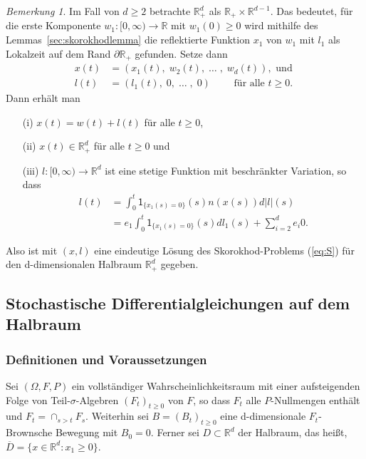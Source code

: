 \documentclass[10pt, a4paper, leqno, twoside, bibliography=totocnumbered, final]{scrartcl}
\theoremstyle{definition}
\theoremstyle{plain}%
\theoremstyle{remark}
\newtheorem*{bem}{Bemerkung}
\begin{document}
\begin{bem}
Im Fall von $d\geq 2$ betrachte $ \mathbb{R}^d_+ $ als $ \mathbb{R}_+ \times \mathbb{R}^{d-1} $. Das bedeutet, für die erste Komponente $w_1 : [0, \infty) \to \mathbb{R}$ mit $ w_1(0) \geq 0$ wird mithilfe des Lemmas~\ref{sec:skorokhodlemma} die reflektierte Funktion $x_1$ von $w_1$ mit $l_1$ als Lokalzeit auf dem Rand $\partial \mathbb{R}_+$ gefunden. Setze dann 
\begin{align*}
x(t) & = ( x_1(t), \; w_2(t), \; \dots \; , \; w_d(t)), \text{ und } \\
l(t) & = ( l_1(t), \; 0, \; \dots \; , \; 0 ) \qquad \text{ für alle $t \geq 0$}.
\end{align*}
Dann erhält man
\begin{enumerate}
\item[(i)] $x(t) = w(t) + l(t) $ für alle $t\geq 0$,
\item[(ii)] $x(t) \in \mathbb{R}^d_+$  für alle $t\geq 0$ und
\item[(iii)] $l: [0, \infty) \to \mathbb{R}^d$ ist eine stetige Funktion mit beschränkter Variation, so dass
\begin{align*}
l(t) & = \int_0^t \mathsf{1}_{\{ x_1(s) = 0 \} }(s) n(x(s)) d|l|(s) \\
& = e_1 \int_0^t \mathsf{1}_{\{ x_1(s) = 0 \} }(s) dl_1(s) + \sum_{i=2}^d e_i 0.
\end{align*}
\end{enumerate}
Also ist mit $(x,l)$ eine eindeutige Lösung des Skorokhod-Problems (\ref{eq:S}) für den d-dimensionalen Halbraum $\mathbb{R}_+^d$ gegeben. 
\end{bem}



\subsection{Stochastische Differentialgleichungen auf dem Halbraum}
\label{sec:SDE_Halbraum}

\subsubsection{Definitionen und Voraussetzungen}


Sei $(\Omega, F, P) $ ein vollständiger Wahrscheinlichkeitsraum mit einer aufsteigenden Folge von Teil-$\sigma$-Algebren $(F_t)_{t \geq 0} $ von $F$, so dass $F_t$ alle $P$-Nullmengen enthält und $ F_t = \cap_{s > t} F_s $. Weiterhin sei $ B = (B_t)_{t \geq 0} $ eine d-dimensionale $ F_{t} $-Brownsche Bewegung mit $ B_{0} = 0 $. Ferner sei $ D \subset \mathbb{R}^{d} $ der Halbraum, das heißt, $ \overline{D} = \{ x \in \mathbb{R}^{d} : x_{1} \geq 0 \} $.\newline
\end{document}
